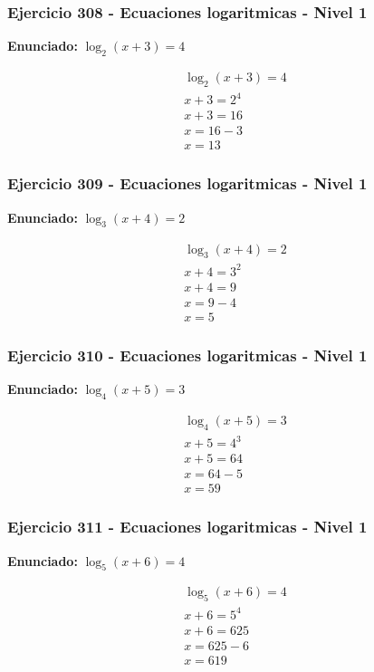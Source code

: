 \documentclass[12pt,a4paper]{article}
\begin{document}
\subsubsection*{Ejercicio 308 - Ecuaciones logaritmicas - Nivel 1}
\textbf{Enunciado:} \(\log_{2}\left(x+3\right)=4\)

\[
\begin{aligned}
\log_{2}\left(x+3\right)=4\\
x+3=2^{4}\\
x+3=16\\
x=16-3\\
\boxed{x=13}
\end{aligned}
\]


\subsubsection*{Ejercicio 309 - Ecuaciones logaritmicas - Nivel 1}
\textbf{Enunciado:} \(\log_{3}\left(x+4\right)=2\)

\[
\begin{aligned}
\log_{3}\left(x+4\right)=2\\
x+4=3^{2}\\
x+4=9\\
x=9-4\\
\boxed{x=5}
\end{aligned}
\]


\subsubsection*{Ejercicio 310 - Ecuaciones logaritmicas - Nivel 1}
\textbf{Enunciado:} \(\log_{4}\left(x+5\right)=3\)

\[
\begin{aligned}
\log_{4}\left(x+5\right)=3\\
x+5=4^{3}\\
x+5=64\\
x=64-5\\
\boxed{x=59}
\end{aligned}
\]


\subsubsection*{Ejercicio 311 - Ecuaciones logaritmicas - Nivel 1}
\textbf{Enunciado:} \(\log_{5}\left(x+6\right)=4\)

\[
\begin{aligned}
\log_{5}\left(x+6\right)=4\\
x+6=5^{4}\\
x+6=625\\
x=625-6\\
\boxed{x=619}
\end{aligned}
\]
\end{document}
